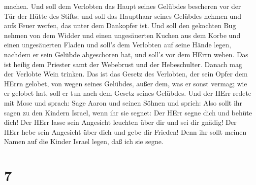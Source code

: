 machen.  Und soll dem Verlobten das Haupt seines Gelübdes
bescheren vor der Tür der Hütte des Stifts; und soll das Haupthaar
seines Gelübdes nehmen und aufs Feuer werfen, das unter dem Dankopfer
ist.  Und soll den gekochten Bug nehmen von dem Widder und
einen ungesäuerten Kuchen aus dem Korbe und einen ungesäuerten Fladen
und soll's dem Verlobten auf seine Hände legen, nachdem er sein Gelübde
abgeschoren hat,  und soll's vor dem HErrn weben. Das ist
heilig dem Priester samt der Webebrust und der Hebeschulter. Danach mag
der Verlobte Wein trinken.  Das ist das Gesetz des
Verlobten, der sein Opfer dem HErrn gelobet, von wegen seines Gelübdes,
außer dem, was er sonst vermag; wie er gelobet hat, soll er tun nach dem
Gesetz seines Gelübdes.  Und der HErr redete mit Mose und
sprach:  Sage Aaron und seinen Söhnen und sprich: Also
sollt ihr sagen zu den Kindern Israel, wenn ihr sie segnet:
 Der HErr segne dich und behüte dich!  Der
HErr lasse sein Angesicht leuchten über dir und sei dir gnädig!
 Der HErr hebe sein Angesicht über dich und gebe dir
Frieden!  Denn ihr sollt meinen Namen auf die Kinder Israel
legen, daß ich sie segne.

\hypertarget{section-6}{%
\section{7}\label{section-6}}

